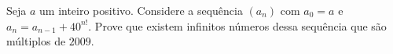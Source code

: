 Seja $a$ um inteiro positivo. Considere a sequência $(a_n)$ com $a_0 = a$ e $a_n = a_{n-1} + 40^{n!}$. Prove que existem infinitos números dessa sequência que são múltiplos de $2009$.
